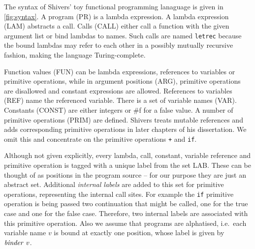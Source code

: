 \documentclass[a4paper,parskip=half,BCOR=8mm,DIV=calc,12pt]{scrbook}
\begin{document}
The syntax of Shivers’ toy functional programming lanaguage is given in \vref{fig:syntax}. A program (PR) is a lambda expression. A lambda expression (LAM) abstracts a call. Calls (CALL) either call a function with the given argument list or bind lambdas to names. Such calls are named \lstinline-letrec- because the bound lambdas may refer to each other in a possibly mutually recursive fashion, making the language Turing-complete.

Function values (FUN) can be lambda expressions, references to variables or primitive operations, while in argument positions (ARG), primitive operations are disallowed and constant expressions are allowed. References to variables (REF) name the referenced variable. There is a set of variable names (VAR). Constants (CONST) are either integers or \#f for a false value. A number of primitive operations (PRIM) are defined. Shivers treats mutable references and adds corresponding primitive operations in later chapters of his dissertation. We omit this and concentrate on the primitive operations \texttt+ and \texttt{if}.

Although not given explicitly, every lambda, call, constant, variable reference and primitive operation is tagged with a unique label from the set LAB. These can be thought of as positions in the program source – for our purpose they are just an abstract set.  Additional \textit{internal labels} are added to this set for primitive operations, representing the internal call sites. For example the \texttt{if} primitive operation is being passed two continuation that might be called, one for the true case and one for the false case. Therefore, two internal labels are associated with this primitive operation. Also we assume that programs are alphatised, i.e.\ each variable name $v$ is bound at exactly one position, whose label is given by $\text{\textit{binder}}\ v$.
\end{document}
